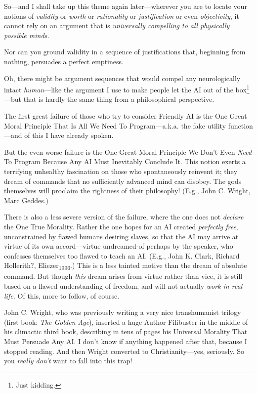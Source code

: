  So---and I shall take up this theme again later---wherever you are
to locate your notions of \textit{validity} or \textit{worth} or
\textit{rationality} or \textit{justification} or even
\textit{objectivity}, it cannot rely on an argument that is
\textit{universally compelling to all physically possible minds.}


 Nor can you ground validity in a sequence of justifications that,
beginning from nothing, persuades a perfect emptiness.


 Oh, there might be argument sequences that would compel any
neurologically intact \textit{human}{}---like the argument I use to
make people let the AI out of the box\footnote{Just kidding.}{}---but that
is hardly the same thing from a philosophical perspective.


 The first great failure of those who try to consider Friendly AI
is the One Great Moral Principle That Is All We Need To
Program---a.k.a. the fake utility function---and of this I have already
spoken.


 But the even worse failure is the One Great Moral Principle We
Don't Even \textit{Need} To Program Because Any AI Must
Inevitably Conclude It. This notion exerts a terrifying unhealthy
fascination on those who spontaneously reinvent it; they dream of
commands that no sufficiently advanced mind can disobey. The gods
themselves will proclaim the rightness of their philosophy! (E.g., John
C. Wright, Marc Geddes.)

{
 There is also a less severe version of the failure, where the one
does not \textit{declare} the One True Morality. Rather the one hopes
for an AI created \textit{perfectly free}, unconstrained by flawed
humans desiring slaves, so that the AI may arrive at virtue of its own
accord---virtue undreamed-of perhaps by the speaker, who confesses
themselves too flawed to teach an AI. (E.g., John K. Clark, Richard
Hollerith?, Eliezer\textsubscript{1996}.) This is a less tainted motive
than the dream of absolute command. But though \textit{this} dream
arises from virtue rather than vice, it is still based on a flawed
understanding of freedom, and will not actually \textit{work in real
life.} Of this, more to follow, of course.}

{
 John C. Wright, who was previously writing a very nice
transhumanist trilogy (first book: \textit{The Golden Age}), inserted a
huge Author Filibuster in the middle of his climactic third book,
describing in tens of pages his Universal Morality That Must Persuade
Any AI. I don't know if anything happened after that,
because I stopped reading. And then Wright converted to
Christianity---yes, seriously. So you \textit{really
don't} want to fall into this trap!}

